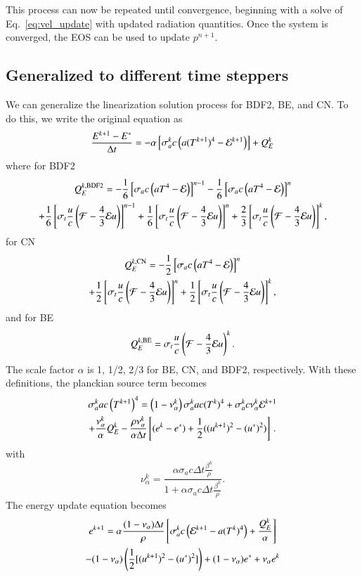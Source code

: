 This process can now be repeated until
convergence, beginning with a solve of Eq.~\eqref{eq:vel_update} with updated
radiation quantities.  Once the system is converged, the EOS can be used to
update $p^{n+1}$.

\subsection{Generalized to different time steppers}

We can generalize the linearization solution process for BDF2, BE, and CN. To do this, we
write the original equation as
\begin{align*}
   \frac{E^{k+1} - E^*}{\Delta t} &= - \alpha \left[\sigma_a^k c \left(
   a(T^{k+1})^4 - \mathcal{E}^{k+1}\right)\right]+Q_E^k \\
\end{align*}
where for BDF2
\begin{multline}
    Q^{k,\text{BDF2}}_E = -\frac{1}{6}\left[\sigma_a c\left( aT^4 - \mathcal{E}\right)\right]^{n-1}
    -\frac{1}{6}\left[\sigma_a c\left( aT^4 - \mathcal{E}\right)\right]^{n} \\
    +\frac{1}{6}\left[\sigma_t \frac{u}{c} \left( \mathcal{F} - \frac{4}{3} \mathcal{E} u \right)\right]^{n-1} + \frac{1}{6}\left[\sigma_t \frac{u}{c} \left( \mathcal{F} - \frac{4}{3} \mathcal{E} u \right)\right]^{n} + \frac{2}{3}\left[\sigma_t \frac{u}{c} \left( \mathcal{F} - \frac{4}{3} \mathcal{E} u \right)\right]^{k},
\end{multline}
for CN
\begin{multline}
    Q^{k,\text{CN}}_E = -\frac{1}{2}\left[\sigma_a c\left( aT^4 - \mathcal{E}\right)\right]^n\\
   +\frac{1}{2}\left[\sigma_t \frac{u}{c} \left( \mathcal{F} - \frac{4}{3} \mathcal{E} u \right)\right]^n + \frac{1}{2}\left[\sigma_t \frac{u}{c} \left( \mathcal{F} - \frac{4}{3} \mathcal{E} u \right)\right]^k,
\end{multline}
and for BE
\begin{equation*}
    Q^{k,\text{BE}}_E = \sigma_t \frac{u}{c} \left( \mathcal{F} - \frac{4}{3} \mathcal{E} u \right)^k.
\end{equation*}
The scale factor $\alpha$ is 1, 1/2, 2/3 for BE, CN, and BDF2, respectively. With
these definitions, the planckian source term becomes
\begin{multline}
   \sigma_a^k a c\left(T^{k+1}\right)^4 = \left(1 - \nu_{\alpha}^k\right)
   \sigma_a^k a c (T^k)^4 + \sigma_a^k c \nu_{\alpha}^k \mathcal{E}^{k+1}\\
   +\frac{\nu_{\alpha}^k}{\alpha} Q_E^k - \frac{\rho\nu_{\alpha}^k}{\alpha\Delta t}
   \left[(e^k - e^*) + \frac{1}{2}((u^{k+1})^2 - (u^*)^2)\right] \, .
\end{multline}
with 
\begin{equation}
    \nu^k_{\alpha} = \frac{\alpha\sigma_a c\Delta t \frac{\beta^k}{\rho}}{1 +
    \alpha\sigma_a c\Delta t \frac{\beta^k}{\rho}}.
\end{equation}
The energy update equation becomes
\begin{multline}
    e^{k+1} = \alpha\frac{(1-\nu_{\alpha})\Delta t}{\rho}\left[\sigma_a^k c \left(
    \mathcal{E}^{k+1} - a(T^k)^4\right) + \frac{Q_E^k}{\alpha} \right] \\ - (1 -
    \nu_{\alpha})\left(\frac{1}{2}[(u^{k+1})^2 - (u^*)^2]\right)
    +(1-\nu_\alpha)e^*+ \nu_{\alpha}e^k
\end{multline}

